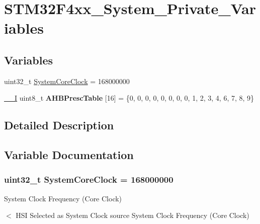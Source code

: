 \hypertarget{group___s_t_m32_f4xx___system___private___variables}{\section{S\-T\-M32\-F4xx\-\_\-\-System\-\_\-\-Private\-\_\-\-Variables}
\label{group___s_t_m32_f4xx___system___private___variables}
}
\subsection*{Variables}
\begin{DoxyCompactItemize}
\item 
uint32\-\_\-t \hyperlink{group___s_t_m32_f4xx___system___private___variables_gaa3cd3e43291e81e795d642b79b6088e6}{System\-Core\-Clock} = 168000000
\item 
\hypertarget{group___s_t_m32_f4xx___system___private___variables_gacdc3ef54c0704c90e69a8a84fb2d970d}{\hyperlink{group___c_m_s_i_s__core__definitions_gaf63697ed9952cc71e1225efe205f6cd3}{\-\_\-\-\_\-\-I} uint8\-\_\-t {\bfseries A\-H\-B\-Presc\-Table} \mbox{[}16\mbox{]} = \{0, 0, 0, 0, 0, 0, 0, 0, 1, 2, 3, 4, 6, 7, 8, 9\}}\label{group___s_t_m32_f4xx___system___private___variables_gacdc3ef54c0704c90e69a8a84fb2d970d}

\end{DoxyCompactItemize}


\subsection{Detailed Description}


\subsection{Variable Documentation}
\hypertarget{group___s_t_m32_f4xx___system___private___variables_gaa3cd3e43291e81e795d642b79b6088e6}{
\subsubsection[{System\-Core\-Clock}]{\setlength{\rightskip}{0pt plus 5cm}uint32\-\_\-t System\-Core\-Clock = 168000000}}\label{group___s_t_m32_f4xx___system___private___variables_gaa3cd3e43291e81e795d642b79b6088e6}
System Clock Frequency (Core Clock)

$<$ H\-S\-I Selected as System Clock source System Clock Frequency (Core Clock) 